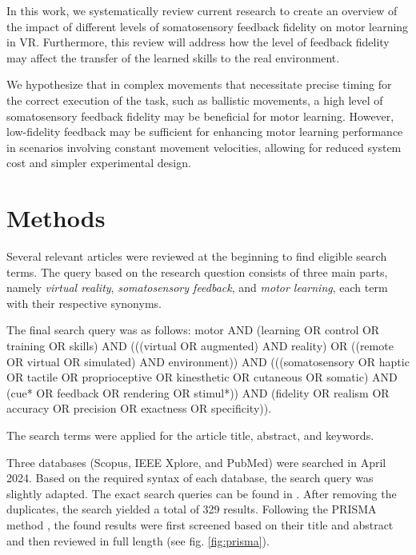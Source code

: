 \documentclass[conference]{IEEEtran}
\begin{document}
In this work, we systematically review current research to create an overview of the impact of different levels of somatosensory feedback fidelity on motor learning in VR. Furthermore, this review will address how the level of feedback fidelity may affect the transfer of the learned skills to the real environment.

We hypothesize that in complex movements that necessitate precise timing for the correct execution of the task, such as ballistic movements, a high level of somatosensory feedback fidelity may be beneficial for motor learning. However, low-fidelity feedback may be sufficient for enhancing motor learning performance in scenarios involving constant movement velocities, allowing for reduced system cost and simpler experimental design. \newpage


\section{Methods}

Several relevant articles were reviewed at the beginning to find eligible search terms. The query based on the research question consists of three main parts, namely \textit{virtual reality}, \textit{somatosensory feedback}, and \textit{motor learning}, each term with their respective synonyms. 

The final search query was as follows: motor AND (learning OR control OR training OR skills) AND (((virtual OR augmented) AND reality) OR ((remote OR virtual OR simulated) AND environment)) AND (((somatosensory OR haptic OR tactile OR proprioceptive OR kinesthetic OR cutaneous OR somatic) AND 
(cue* OR feedback OR rendering OR stimul*)) AND (fidelity OR realism OR accuracy OR precision OR exactness OR specificity)). 

The search terms were applied for the article title, abstract, and keywords.

Three databases (Scopus, IEEE Xplore, and PubMed) were searched in April 2024. Based on the required syntax of each database, the search query was slightly adapted. The exact search queries can be found in .
After removing the duplicates, the search yielded a total of 329 results.
Following the PRISMA method \cite{Page2021TheReviews}, the found results were first screened based on their title and abstract and then reviewed in full length (see fig. \ref{fig:prisma}).
\end{document}
